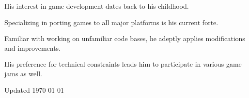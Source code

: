 \documentclass[11pt,letterpaper]{report}
\newcommand{\listitemspace}{0.25em}
\renewenvironment{itemize}
{\begin{list}{}{\setlength{\leftmargin}{0em}
                \setlength{\parskip}{0em}
                \setlength{\itemsep}{\listitemspace}
                \setlength{\parsep}{\listitemspace}}}
{\end{list}}
\begin{document}
    \begin{itemize}

        \item His interest in game development dates back to his childhood.
        \item Specializing in porting games to all major platforms is his current forte.
        \item Familiar with working on unfamiliar code bases, he adeptly applies modifications and improvements.
        \item His preference for technical constraints leads him to participate in various game jams as well.

    \end{itemize}



    \begin{center}
        \vfill
        Updated \monthyeardate\today
    \end{center}
\end{document}
